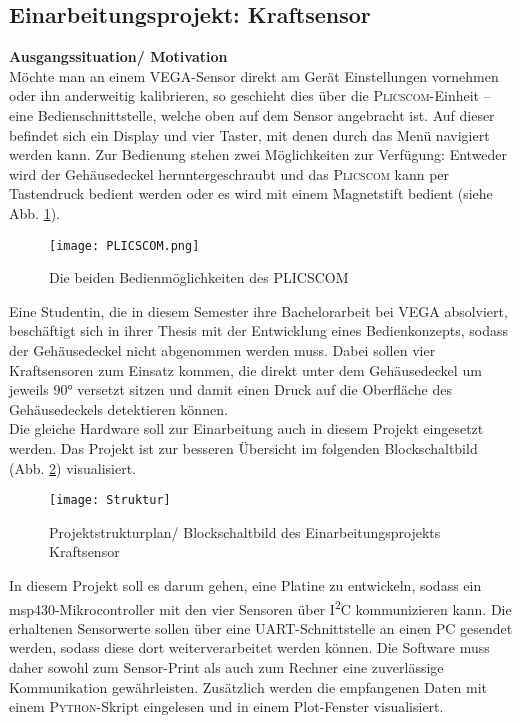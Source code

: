 \documentclass[
	letterpaper, %
	10pt, %
]{CSUniSchoolLabReport}
\begin{document}
\begin{spacing}{1.6}
\newpage
\section{Einarbeitungsprojekt: Kraftsensor}
\textbf{Ausgangssituation/ Motivation}\\
Möchte man an einem VEGA-Sensor direkt am Gerät Einstellungen vornehmen oder ihn
anderweitig kalibrieren, so geschieht dies über die \textsc{Plicscom}-Einheit – eine
Bedienschnittstelle, welche oben auf dem Sensor angebracht ist. Auf dieser befindet sich ein
Display und vier Taster, mit denen durch das Menü navigiert werden kann.
Zur Bedienung stehen zwei Möglichkeiten zur Verfügung: Entweder wird der Gehäusedeckel heruntergeschraubt und das
\textsc{Plicscom} kann per Tastendruck bedient werden oder es wird mit einem Magnetstift bedient (siehe Abb. \ref{fig:PLICSCOM}).

\begin{figure}[H]
    \centering
    \texttt{[image: PLICSCOM.png]}
    \caption{Die beiden Bedienmöglichkeiten des \textsc{PLICSCOM}}
    \label{fig:PLICSCOM}
\end{figure}
Eine Studentin, die in diesem Semester ihre Bachelorarbeit bei VEGA absolviert, beschäftigt sich in ihrer Thesis mit der Entwicklung eines Bedienkonzepts, sodass der Gehäusedeckel nicht abgenommen werden muss. Dabei sollen vier Kraftsensoren zum Einsatz kommen, die direkt
unter dem Gehäusedeckel um jeweils 90° versetzt sitzen und damit einen Druck auf die
Oberfläche des Gehäusedeckels detektieren können.\\

Die gleiche Hardware soll zur Einarbeitung auch in diesem Projekt eingesetzt werden. Das Projekt ist zur besseren Übersicht im folgenden Blockschaltbild (Abb. \ref{fig:Projektstrukturplan}) visualisiert.
\begin{figure}[H]
    \centering
    \texttt{[image: Struktur]}
    \caption{Projektstrukturplan/ Blockschaltbild des Einarbeitungsprojekts \glqq Kraftsensor\grqq}
    \label{fig:Projektstrukturplan}
\end{figure}
In diesem Projekt soll es darum gehen, eine Platine zu entwickeln, sodass ein
msp430-Mikrocontroller mit den vier Sensoren über I\textsuperscript{2}C kommunizieren kann. Die erhaltenen
Sensorwerte sollen über eine UART-Schnittstelle an einen PC gesendet werden, sodass diese
dort weiterverarbeitet werden können. Die Software muss daher sowohl zum Sensor-Print als
auch zum Rechner eine zuverlässige Kommunikation gewährleisten. Zusätzlich werden die empfangenen Daten mit einem \textsc{Python}-Skript eingelesen und in einem Plot-Fenster visualisiert.\\


\end{spacing}
\end{document}

